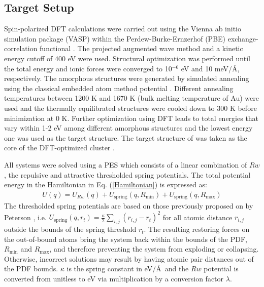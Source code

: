\subsection{Target Setup}
Spin-polarized  DFT calculations were carried out using the Vienna ab initio simulation package (VASP) \cite{Kresse1993, Kresse1994} within the  Perdew-Burke-Ernzerhof (PBE) exchange-correlation functional \cite{PERD1996}.
The projected augmented wave method \cite{Blochl1994} and a kinetic energy cutoff of 400 eV were used.
Structural optimization was performed until the total energy and ionic forces were converged to 10$^{-6}$ eV and 10 meV/\AA, respectively.
The  amorphous  structures were generated by simulated annealing using the classical embedded atom method potential \cite{Sheng2011}.
Different annealing temperatures between 1200 K and 1670 K (bulk melting temperature of Au) were used and the thermally equilibrated structures were cooled down to 300 K before minimization at 0 K.
Further optimization using DFT leads to total energies that vary within 1-2 eV among different amorphous structures  and the lowest energy one was used as the target structure. The target structure of  was taken as the  core of the DFT-optimized  cluster \cite{Li2008}.

All systems were solved using a PES  which consists of a linear combination of $Rw$, the repulsive and attractive thresholded spring potentials.  The total potential energy in the Hamiltonian in Eq. (\ref{Hamiltonian}) is expressed as:
\begin{eqnarray}\label{eq:Ucomp}
  U(q) = U_{Rw}(q) + U_\mathrm{spring}(q, R_\mathrm{min}) + U_\mathrm{spring}(q, R_\mathrm{max})
\end{eqnarray}
The thresholded spring potentials are based on those previously proposed on by Peterson \cite{Peterson2014}, i.e.  $U_\mathrm{spring}(q, r_{t}) = \frac{\kappa}{2}\sum_{i, j}(r_{i, j}-r_t)^{2}$  for all atomic distance $r_{i,j}$  outside the bounds of the spring threshold $r_t$.
The resulting restoring forces on the out-of-bound atoms  bring the system back within the bounds of the PDF, $R_\mathrm{min}$ and $R_\mathrm{max}$, and therefore preventing the system from exploding or collapsing.
Otherwise,  incorrect solutions may result by having atomic pair distances out of the PDF bounds.  $\kappa$ is the spring constant in eV/\AA~and the $Rw$ potential is converted from unitless to eV via multiplication by a conversion factor $\lambda$.

